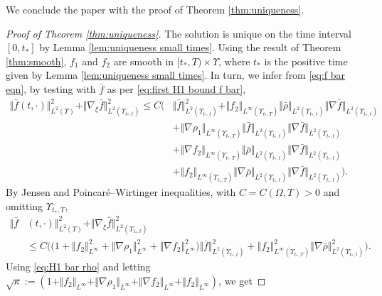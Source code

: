 \documentclass[11pt,a4paper,reqno]{amsart}
\theoremstyle{remark}
\theoremstyle{definition}
\numberwithin{equation}{section}
\newcommand{\bxi}{\xi}
\begin{document}
We conclude the paper with the proof of Theorem \ref{thm:uniqueness}. 

\begin{proof}[Proof of Theorem \ref{thm:uniqueness}]
The solution is unique on the time interval $[0,t_*]$ by Lemma \ref{lem:uniqueness small times}. Using the result of Theorem \ref{thm:smooth}, $f_1$ and $f_2$ are smooth in $[t_*,T) \times \Upsilon$, where $t_*$ is the positive time given by Lemma \ref{lem:uniqueness small times}. In turn, we infer from \eqref{eq:f bar eqn}, by testing with $\bar{f}$ as per \eqref{eq:first H1 bound f bar}, 
\begin{equation*}
    \begin{aligned}
        \Vert\bar{f}(t,\cdot)\Vert_{L^2(\Upsilon)}^2 + \Vert \nabla_{\bxi} \bar{f}\Vert_{L^2(\Upsilon_{t_*,t})}^2 \leq C\Big( & \Vert \bar{f} \Vert^2_{L^2(\Upsilon_{t_*,t})} + \Vert f_2 \Vert_{L^\infty(\Upsilon_{t_*,T})} \Vert \bar{\rho}\Vert_{L^2(\Upsilon_{t_*,t})}\Vert \nabla \bar{f} \Vert_{L^2(\Upsilon_{t_*,t})}  \\ 
        &+ \Vert \nabla \rho_1 \Vert_{L^\infty(\Upsilon_{t_*,T})} \Vert \bar{f} \Vert_{L^2(\Upsilon_{t_*,t})}\Vert \nabla \bar{f} \Vert_{L^2(\Upsilon_{t_*,t})} \\ 
        &+ \Vert \nabla f_2 \Vert_{L^\infty(\Upsilon_{t_*,T})} \Vert \bar{\rho} \Vert_{L^2(\Upsilon_{t_*,t})} \Vert \nabla \bar{f} \Vert_{L^2(\Upsilon_{t_*,t})} \\ 
        &+ \Vert f_2 \Vert_{L^\infty(\Upsilon_{t_*,T})} \Vert \nabla\bar{\rho} \Vert_{L^2(\Upsilon_{t_*,t})}\Vert \nabla \bar{f} \Vert_{L^2(\Upsilon_{t_*,t})} \Big). 
    \end{aligned}
\end{equation*}
By Jensen and Poincar\'e--Wirtinger inequalities, with $C=C(\Omega,T)>0$ and omitting $\Upsilon_{t_*,T}$, 
\begin{equation*}
    \begin{aligned}
        \Vert\bar{f}&(t,\cdot)\Vert_{L^2(\Upsilon)}^2 + \Vert \nabla_{\bxi} \bar{f} \Vert_{L^2(\Upsilon_{t_*,t})}^2 \\ 
       & \leq C\Big( \big(1 \!+\! \Vert f_2 \Vert_{L^\infty}^2 \!+\! \Vert \nabla \rho_1 \Vert_{L^\infty}^2 \!+\! \Vert \nabla f_2 \Vert_{L^\infty}^2   \big) \Vert \bar{f} \Vert_{L^2(\Upsilon_{t_*,t})}^2 \!+\! \Vert f_2 \Vert_{L^\infty(\Upsilon_{t_*,T})}^2 \Vert \nabla\bar{\rho} \Vert_{L^2(\Upsilon_{t_*,t})}^2\Big). 
    \end{aligned}
\end{equation*}
Using \eqref{eq:H1 bar rho} and letting $\sqrt{\kappa} := (1 + \Vert f_2 \Vert_{L^\infty} + \Vert \nabla \rho_1 \Vert_{L^\infty} + \Vert \nabla f_2 \Vert_{L^\infty} + \Vert f_2 \Vert_{L^\infty})$, we get 

\end{proof}
\end{document}
